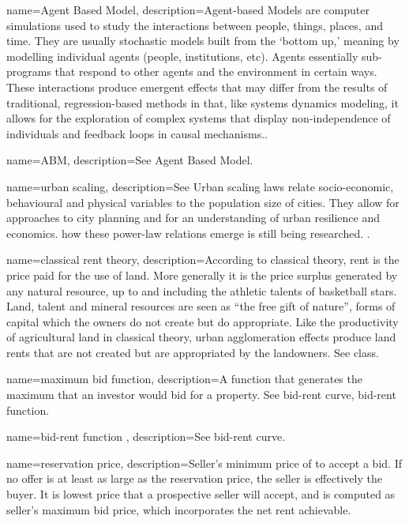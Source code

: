 {
name=Agent Based Model,
description={Agent-based Models are computer simulations used to study the interactions between people, things, places, and time. They are usually stochastic models built from the `bottom up,' meaning by modelling individual agents (people, institutions, etc). Agents essentially sub-programs that respond to other agents and the environment in certain ways. These interactions produce emergent effects that may differ from the results of traditional, regression-based methods in that, like systems dynamics modeling, it allows for the exploration of complex systems that display non-independence of individuals and feedback loops in causal mechanisms..}
}


{
name=ABM,
description={See \gls{Agent Based Model}.}
}


{
name=urban scaling,
description={See Urban scaling laws relate socio-economic, behavioural and physical variables to the population size of cities. They allow for approaches  to city planning and for an understanding of urban resilience and economics. how  these power-law relations emerge is still being researched. \cite{doi:10.1098/rsif.2020.0705}\gls{}.}
}


{
name=classical rent theory,
description={According to classical theory, rent is the price paid for the use of land. More generally it is the price surplus generated by any natural resource, up to and including the athletic talents of basketball stars.\cite{lackmanClassicalBaseModern1976} Land, talent and mineral resources are seen as ``the free gift of nature'', forms of capital which the owners do not create but do appropriate. Like the productivity of agricultural land in classical theory,  urban \gls{agglomeration effect}s produce land rents that are not created but are appropriated by the landowners. See \gls{class}.}
}


{
name=maximum bid function,
description={A function that generates the maximum that an investor would bid for a property.  See \gls{bid-rent curve}, \gls{bid-rent function}.}
}

{
name=bid-rent function ,
description={See \gls{bid-rent curve}.}
}

{
name=reservation price,
description={Seller's minimum price of to accept a bid. If no offer is at least as large as the reservation price, the seller is effectively the buyer. It is lowest price that a prospective seller will accept, and is computed as seller's maximum bid price, which incorporates the net rent achievable.}
}


